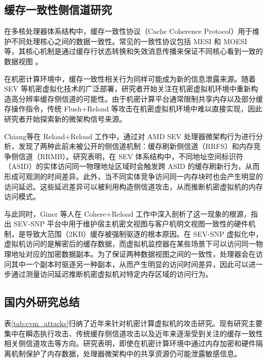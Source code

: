\subsection{缓存一致性侧信道研究}
在多核处理器体系结构中，缓存一致性协议（Cache Coherence Protocol）用于维护不同处理核心之间的数据一致性。常见的一致性协议包括 MESI 和 MOESI 等，其核心机制是通过缓存行状态转换和失效消息传播来保证不同核心看到一致的数据视图 \cite{amd64manual}。

在机密计算环境中，缓存一致性相关行为同样可能成为新的信息泄露来源。随着 SEV 等机密虚拟化技术的广泛部署，研究者开始关注在机密虚拟机环境中重新构造高分辨率缓存侧信道的可能性。由于机密计算平台通常限制共享内存以及部分缓存操作指令，传统 Flush+Reload 等攻击在机密虚拟机环境中难以直接实现，因此研究者开始探索新的微架构信号来源。

Chiang等在 Reload+Reload 工作中，通过对 AMD SEV 处理器微架构行为进行分析，发现了两种此前未被公开的侧信道机制：缓存刷新侧信道（RRFS）和内存竞争侧信道（RRMB）\cite{chiang2025reloadreload}。研究表明，在 SEV 体系结构中，不同地址空间标识符（ASID）的实体访问同一物理地址区域时会触发跨 ASID 的缓存刷新行为，从而形成可观测的时间差异。此外，当不同实体竞争访问同一内存块时也会产生明显的访问延迟。这些延迟差异可以被利用构造侧信道攻击，从而推断机密虚拟机的内存访问模式。

与此同时，Giner 等人在 Cohere+Reload 工作中深入剖析了这一现象的根源，指出 SEV-SNP 平台中用于维护宿主机密文视图与客户机明文视图一致性的硬件机制，是导致大范围（2KB）缓存被强制驱逐的根本原因。在 SEV-SNP 虚拟化中，虚拟机访问的是解密后的缓存数据，而虚拟机监控器在某些场景下可以访问同一物理地址对应的加密数据副本。为了保证两种数据视图之间的一致性，处理器会在访问其中一个副本时驱逐另一种副本，从而产生明显的访问时间差异，因此可以进一步通过测量访问延迟推断机密虚拟机对特定内存区域的访问行为。\cite{giner2025coherereload}

\subsection{国内外研究总结}
表\ref{tab:cvm_attacks}归纳了近年来针对机密计算虚拟机的攻击研究。现有研究主要集中在瞬态执行攻击、传统缓存侧信道攻击以及近年来逐渐受到关注的缓存一致性相关侧信道攻击等方向。研究表明，即使在机密计算环境中通过内存加密和硬件隔离机制保护了内存数据，处理器微架构中的共享资源仍可能泄露敏感信息。

